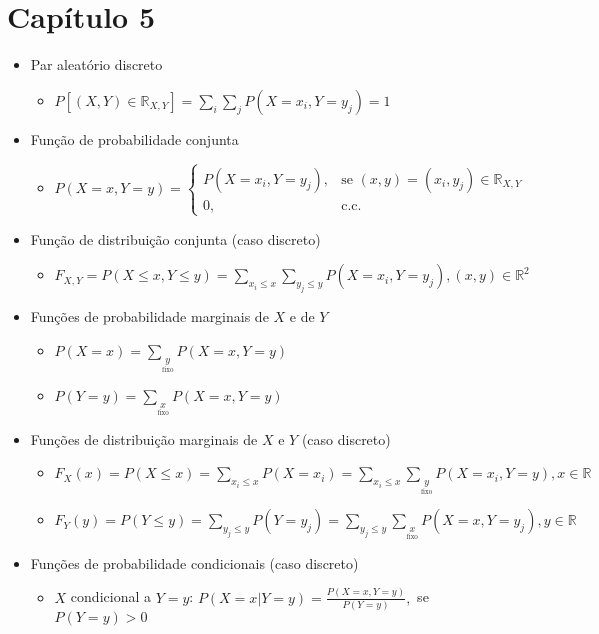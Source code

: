 \documentclass[a4paper]{report}
\begin{document}
	\section*{Capítulo 5}
	\begin{itemize}
		\item Par aleatório discreto
		\begin{itemize}
			\item $P[(X,Y)\in\mathbb R_{X,Y}]=\sum_i\sum_j P(X=x_i,Y=y_j)=1$
		\end{itemize}
		\item Função de probabilidade conjunta
		\begin{itemize}
			\item $P(X=x,Y=y)=\begin{cases}P(X=x_i,Y=y_j),&\text{se }(x,y)=(x_i,y_j)\in\mathbb R_{X,Y}\\
			0,&\text{c.c.}\end{cases}$
		\end{itemize}
		\item Função de distribuição conjunta (caso discreto)
		\begin{itemize}
			\item $F_{X,Y}=P(X\leq x,Y\leq y)=\sum_{x_i\leq x}\sum_{y_j\leq y} P(X=x_i,Y=y_j),(x,y)\in\mathbb R^2$
		\end{itemize}
		\item Funções de probabilidade marginais de $X$ e de $Y$
		\begin{itemize}
			\item $P(X=x)=\sum_{\underset{\text{fixo}}{y}} P(X=x,Y=y)$
			\item $P(Y=y)=\sum_{\underset{\text{fixo}}{x}} P(X=x,Y=y)$
		\end{itemize}
		\item Funções de distribuição marginais de $X$ e $Y$ (caso discreto)
		\begin{itemize}
			\item $F_X(x)=P(X\leq x)=\sum_{x_i\leq x}P(X=x_i)=\sum_{x_i\leq x}\sum_{\underset{\text{fixo}}{y}} P(X=x_i,Y=y),x\in\mathbb R$
			\item $F_Y(y)=P(Y\leq y)=\sum_{y_j\leq y}P(Y=y_j)=\sum_{y_j\leq y}\sum_{\underset{\text{fixo}}{x}} P(X=x,Y=y_j),y\in\mathbb R$
		\end{itemize}
		\item Funções de probabilidade condicionais (caso discreto)
		\begin{itemize}
			\item $X$ condicional a $Y=y$: $P(X=x|Y=y)=\frac{P(X=x,Y=y)}{P(Y=y)},$ se $P(Y=y)>0$

\end{itemize}
\end{itemize}
\end{document}
